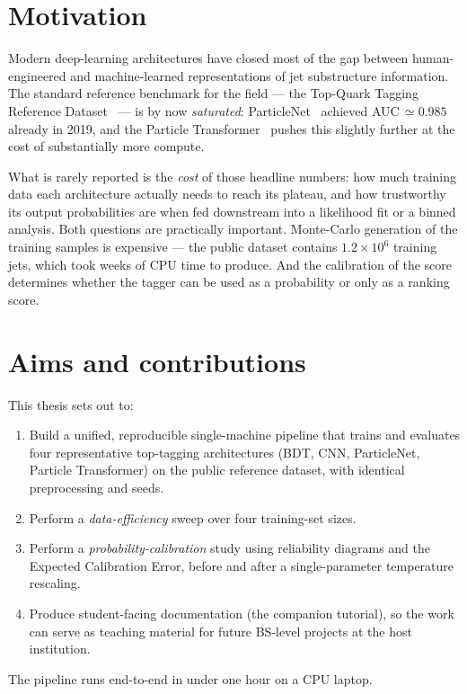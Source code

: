 \documentclass[12pt,a4paper,oneside]{report}
\begin{document}
\section{Motivation}
Modern deep-learning architectures have closed most of the gap
between human-engineered and machine-learned representations of
jet substructure information.  The standard reference benchmark for
the field --- the Top-Quark Tagging Reference Dataset~\cite{topref}
--- is by now \emph{saturated}: ParticleNet~\cite{particlenet}
achieved AUC\,$\simeq\!0.985$ already in 2019, and the Particle
Transformer~\cite{partformer} pushes this slightly further at the
cost of substantially more compute.

What is rarely reported is the \emph{cost} of those headline
numbers: how much training data each architecture actually needs to
reach its plateau, and how trustworthy its output probabilities are
when fed downstream into a likelihood fit or a binned analysis.
Both questions are practically important.  Monte-Carlo generation of
the training samples is expensive --- the public dataset contains
$1.2\!\times\!10^6$ training jets, which took weeks of CPU time to
produce.  And the calibration of the score determines whether the
tagger can be used as a probability or only as a ranking score.

\section{Aims and contributions}
This thesis sets out to:
\begin{enumerate}
    \item Build a unified, reproducible single-machine pipeline that
          trains and evaluates four representative top-tagging
          architectures (BDT, CNN, ParticleNet, Particle
          Transformer) on the public reference dataset, with
          identical preprocessing and seeds.
    \item Perform a \emph{data-efficiency} sweep over four
          training-set sizes.
    \item Perform a \emph{probability-calibration} study using
          reliability diagrams and the Expected Calibration Error,
          before and after a single-parameter temperature
          rescaling.
    \item Produce student-facing documentation (the companion
          tutorial), so the work can serve as teaching material for
          future BS-level projects at the host institution.
\end{enumerate}
The pipeline runs end-to-end in under one hour on a CPU laptop.
\end{document}
